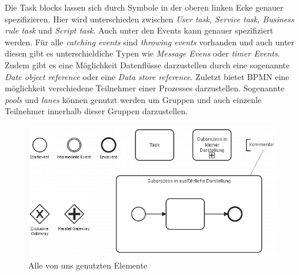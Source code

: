 Die Task blocks lassen sich durch Symbole in der oberen linken Ecke genauer spezifizieren. Hier wird unterschieden zwischen \textit{User task, Service task, Business rule task} und \textit{Script task}. Auch unter den Events kann genauer spezifiziert werden. Für alle \textit{catching events} sind \textit{throwing events} vorhanden und auch unter diesen gibt es unterschieldiche Typen wie \textit{Message Evens} oder \textit{timer Events}. Zudem gibt es eine Möglichkeit Datenflüsse darzustellen durch eine sogenannte \textit{Date object reference} oder eine \textit{Data store reference}. Zuletzt bietet BPMN eine möglichkeit verschiedene Teilnehmer einer Prozesses darzustellen. Sogenannte \textit{pools} und \textit{lanes} können genutzt werden um Gruppen und auch einzenle Teilnehmer innerhalb dieser Gruppen darzustellen.\\
\begin{figure}
\centering
\includegraphics[scale=0.5]{Figures/Alleblocke}
\decoRule
\caption[Alle Elemente]{Alle von uns genutzten Elemente}
\label{alleElem}
\end{figure}

